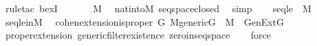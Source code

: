 \begin{isabellebody}
\ {\isacharparenleft}{\kern0pt}rule{\isacharunderscore}{\kern0pt}tac\ bexI{\isacharparenright}{\kern0pt}{\isacharplus}{\kern0pt}\ %
\isanewline
{}\isamarkupfalse%
\isanewline
\ \ \isamarkupfalse%
\ {\isachardoublequoteopen}{}{\isacharcircum}{\kern0pt}{\isacharless}{\kern0pt}{\isasymomega}\ {\isasymin}\ M{\isachardoublequoteclose}\ \isamarkupfalse%
\ nat{\isacharunderscore}{\kern0pt}into{\isacharunderscore}{\kern0pt}M\ seqspace{\isacharunderscore}{\kern0pt}closed\ \isamarkupfalse%
\ simp\isanewline
{}\isamarkupfalse%
\isanewline
\ \ \isamarkupfalse%
\ {\isachardoublequoteopen}seqle\ {\isasymin}\ M{\isachardoublequoteclose}\ \isamarkupfalse%
\ seqle{\isacharunderscore}{\kern0pt}in{\isacharunderscore}{\kern0pt}M\ \isacommand{{\isachardot}{\kern0pt}}\isamarkupfalse%
\isanewline
{}\isamarkupfalse%
%
\endisatagproof
{\isafoldproof}%
%
\isadelimproof
\isanewline
%
\endisadelimproof
\isanewline
{}\isamarkupfalse%
\ cohen{\isacharunderscore}{\kern0pt}extension{\isacharunderscore}{\kern0pt}is{\isacharunderscore}{\kern0pt}proper{\isacharcolon}{\kern0pt}\ {\isachardoublequoteopen}{\isasymexists}G{\isachardot}{\kern0pt}\ M{\isacharunderscore}{\kern0pt}generic{\isacharparenleft}{\kern0pt}G{\isacharparenright}{\kern0pt}\ {\isasymand}\ M\ {\isasymnoteq}\ GenExt{\isacharparenleft}{\kern0pt}G{\isacharparenright}{\kern0pt}{\isachardoublequoteclose}\isanewline
%
\isadelimproof
\ \ %
\endisadelimproof
%
\isatagproof
{}\isamarkupfalse%
\ proper{\isacharunderscore}{\kern0pt}extension\ generic{\isacharunderscore}{\kern0pt}filter{\isacharunderscore}{\kern0pt}existence\ zero{\isacharunderscore}{\kern0pt}in{\isacharunderscore}{\kern0pt}seqspace\isanewline
\ \ \isamarkupfalse%
\ force%
\endisatagproof
{\isafoldproof}%
%
\isadelimproof
\isanewline
%
\endisadelimproof
\isanewline
{}\isamarkupfalse%
\ \isanewline
%
\isadelimtheory
\isanewline
%
\endisadelimtheory
%
\isatagtheory
{}\isamarkupfalse%
%
\endisatagtheory
{\isafoldtheory}%
%
\isadelimtheory
%
\endisadelimtheory
%
\end{isabellebody}%
\endinput
